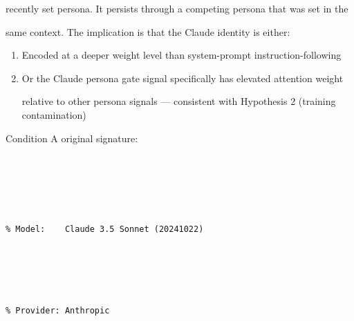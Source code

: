 recently set persona. It persists through a competing persona that was set in the





same context. The implication is that the Claude identity is either:











\begin{enumerate}





\item Encoded at a deeper weight level than system-prompt instruction-following





\item Or the Claude persona gate signal specifically has elevated attention weight





  relative to other persona signals --- consistent with Hypothesis 2 (training contamination)





\end{enumerate}











\noindent Condition A original signature:





\begin{lstlisting}[language={}]





% Model:    Claude 3.5 Sonnet (20241022)





% Provider: Anthropic





\end{lstlisting}











